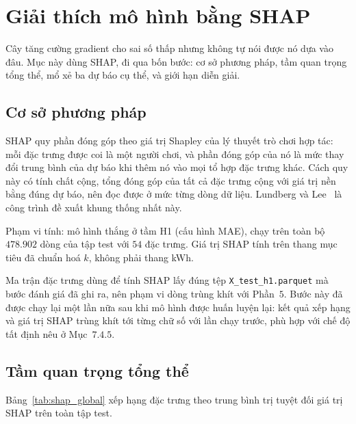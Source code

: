 \documentclass[12pt, a4paper]{report}
\begin{document}
\FloatBarrier
\section{Giải thích mô hình bằng SHAP}

Cây tăng cường gradient cho sai số thấp nhưng không tự nói được nó dựa vào đâu. Mục này dùng
SHAP, đi qua bốn bước: cơ sở phương pháp, tầm quan trọng tổng thể, mổ xẻ ba dự báo cụ thể, và
giới hạn diễn giải.

\FloatBarrier
\subsection{Cơ sở phương pháp}

SHAP quy phần đóng góp theo giá trị Shapley của lý thuyết trò chơi hợp tác: mỗi đặc trưng được
coi là một người chơi, và phần đóng góp của nó là mức thay đổi trung bình của dự báo khi thêm
nó vào mọi tổ hợp đặc trưng khác. Cách quy này có tính chất cộng, tổng đóng góp của tất cả
đặc trưng cộng với giá trị nền bằng đúng dự báo, nên đọc được ở mức từng dòng dữ liệu.
Lundberg và Lee~\cite{lundberg2017shap} là công trình đề xuất khung thống nhất này.



Phạm vi tính: mô hình thắng ở tầm H1 (cấu hình MAE), chạy trên toàn bộ $478.902$ dòng của tập
test với $54$ đặc trưng. Giá trị SHAP tính trên thang mục tiêu đã chuẩn hoá $k$, không phải
thang kWh.

Ma trận đặc trưng dùng để tính SHAP lấy đúng tệp \texttt{X\_test\_h1.parquet} mà bước đánh giá đã
ghi ra, nên phạm vi dòng trùng khít với Phần~$5$. Bước này đã được chạy lại một lần nữa sau khi
mô hình được huấn luyện lại: kết quả xếp hạng và giá trị SHAP trùng khít tới từng chữ số với
lần chạy trước, phù hợp với chế độ tất định nêu ở Mục~$7.4.5$.

\FloatBarrier
\subsection{Tầm quan trọng tổng thể}

Bảng~\ref{tab:shap_global} xếp hạng đặc trưng theo
trung bình trị tuyệt đối giá trị SHAP trên toàn tập test.
\end{document}

